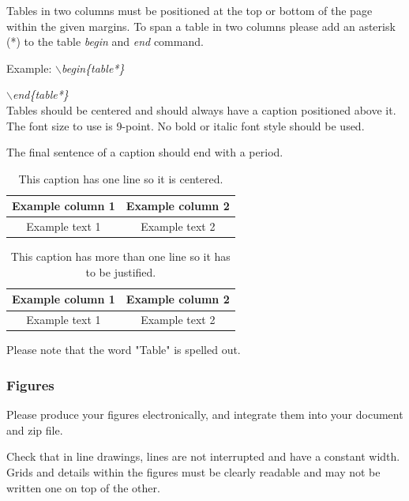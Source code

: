 \documentclass[a4paper,twoside]{article}
\begin{document}
Tables in two columns must be positioned at the top or bottom of the
page within the given margins. To span a table in two columns please add an asterisk (*) to the table \textit{begin} and \textit{end} command.

Example: \textit{$\backslash$begin\{table*\}}

\hspace*{1.5cm}\textit{$\backslash$end\{table*\}}\\

Tables should be centered and should always have a caption
positioned above it. The font size to use is 9-point. No bold or
italic font style should be used.

The final sentence of a caption should end with a period.

\begin{table}[h]
\caption{This caption has one line so it is
centered.}\label{tab:example1} \centering
\begin{tabular}{|c|c|}
  \hline
  Example column 1 & Example column 2 \\
  \hline
  Example text 1 & Example text 2 \\
  \hline
\end{tabular}
\end{table}

\begin{table}[h]
\vspace{-0.2cm}
\caption{This caption has more than one line so it has to be
justified.}\label{tab:example2} \centering
\begin{tabular}{|c|c|}
  \hline
  Example column 1 & Example column 2 \\
  \hline
  Example text 1 & Example text 2 \\
  \hline
\end{tabular}
\end{table}

Please note that the word "Table" is spelled out.


\subsubsection{Figures}

Please produce your figures electronically, and integrate them into
your document and zip file.

Check that in line drawings, lines are not interrupted and have a
constant width. Grids and details within the figures must be clearly
readable and may not be written one on top of the other.
\end{document}
